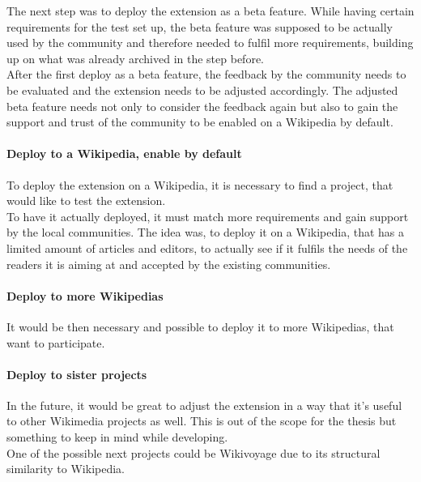   The next step was to deploy the extension as a beta feature. While having certain requirements for the test set up, the beta feature was supposed to be actually used by the community and therefore needed to fulfil more requirements, building up on what was already archived in the step before. \\
  After the first deploy as a beta feature, the feedback by the community needs to be evaluated and the extension needs to be adjusted accordingly. The adjusted beta feature needs not only to consider the feedback again but also to gain the support and trust of the community to be enabled on a Wikipedia by default.

  \paragraph{Deploy to a Wikipedia, enable by default}
  To deploy the extension on a Wikipedia, it is necessary to find a project, that would like to test the extension. \\
  To have it actually deployed, it must match more requirements and gain support by the local communities. The idea was, to deploy it on a Wikipedia, that has a limited amount of articles and editors, to actually see if it fulfils the needs of the readers it is aiming at and accepted by the existing communities. 

  \paragraph{Deploy to more Wikipedias}
  It would be then necessary and possible to deploy it to more Wikipedias, that want to participate. 

  \paragraph{Deploy to sister projects}
  In the future, it would be great to adjust the extension in a way that it's useful to other Wikimedia projects as well. This is out of the scope for the thesis but something to keep in mind while developing. \\
  One of the possible next projects could be Wikivoyage due to its structural similarity to Wikipedia.